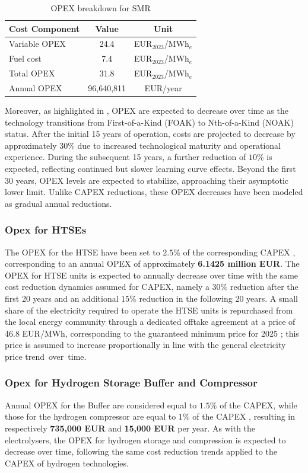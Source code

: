 \begin{table}[H]
    \centering
    \begin{tabular}{lcc}
        \hline
        \textbf{Cost Component} & \textbf{Value} & \textbf{Unit} \\
        \hline
        Variable OPEX & 24.4 & EUR$_{2023}$/MWh$_e$ \\
        Fuel cost & 7.4 & EUR$_{2023}$/MWh$_e$ \\
        Total OPEX & 31.8 & EUR$_{2023}$/MWh$_e$ \\
        Annual OPEX & 96,640,811 & EUR/year \\
        \hline
    \end{tabular}
    \caption{OPEX breakdown for SMR}
    \label{tab:smr_opex}
\end{table}

Moreover, as highlighted in \cite{VanHee2024}, OPEX are expected to decrease over time as the technology transitions from First-of-a-Kind (FOAK) to Nth-of-a-Kind (NOAK) status. After the initial 15 years of operation, costs are projected to decrease by approximately $30\%$ due to increased technological maturity and operational experience. During the subsequent 15 years, a further reduction of $10\%$ is expected, reflecting continued but slower learning curve effects. Beyond the first 30 years, OPEX levels are expected to stabilize, approaching their asymptotic lower limit. Unlike CAPEX reductions, these OPEX decreases have been modeled as gradual annual reductions.

\subsubsection{Opex for HTSEs}
The OPEX for the HTSE have been set to $2.5\%$ of the corresponding CAPEX \cite{TANDEM2023}, corresponding to an annual OPEX of approximately \textbf{6.1425 million EUR}. The OPEX for HTSE units is expected to annually decrease over time with the same cost reduction dynamics assumed for CAPEX, namely a $30\%$ reduction after the first 20 years and an additional $15\%$ reduction in the following 20 years. A small share of the electricity required to operate the HTSE units is repurchased from the local energy community through a dedicated offtake agreement at a price of 46.8 EUR/MWh, corresponding to the guaranteed minimum price for 2025 \cite{GSE2025}; this price is assumed to increase proportionally in line with the general electricity price trend over time.

\subsubsection{Opex for Hydrogen Storage Buffer and Compressor}
Annual OPEX for the Buffer are considered equal to $1.5\%$ of the CAPEX, while those for the hydrogen compressor are equal to $1\%$ of the CAPEX \cite{TANDEM2023}, resulting in respectively \textbf{735,000 EUR} and \textbf{15,000 EUR} per year. As with the electrolysers, the OPEX for hydrogen storage and compression is expected to decrease over time, following the same cost reduction trends applied to the CAPEX of hydrogen technologies.

